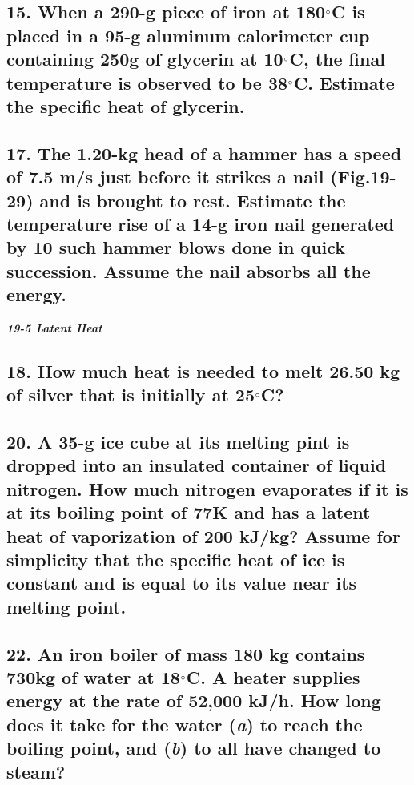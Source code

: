 \documentclass{article}
\begin{document}
\subsection*{15. When a 290-g piece of iron at 180$\degree$C is placed in a 95-g aluminum calorimeter cup containing 250g of glycerin at 10$\degree$C, the final temperature is observed to be 38$\degree$C. Estimate the specific heat of glycerin.}

\subsection*{17. The 1.20-kg head of a hammer has a speed of 7.5 m/s just before it strikes a nail (Fig.19-29) and is brought to rest. Estimate the temperature rise of a 14-g iron nail generated by 10 such hammer blows done in quick succession. Assume the nail absorbs all the energy.}
\vspace{1em}
\large{\textbf{\textit{19-5 Latent Heat}}}

\subsection*{18. How much heat is needed to melt 26.50 kg of silver that is initially at 25$\degree$C?}

\subsection*{20. A 35-g ice cube at its melting pint is dropped into an insulated container of liquid nitrogen. How much nitrogen evaporates if it is at its boiling point of 77K and has a latent heat of vaporization of 200 kJ/kg? Assume for simplicity that the specific heat of ice is constant and is equal to its value near its melting point.}

\subsection*{22. An iron boiler of mass 180 kg contains 730kg of water at 18$\degree$C. A heater supplies energy at the rate of 52,000 kJ/h. How long does it take for the water (\textit a) to reach the boiling point, and (\textit b) to all have changed to steam?}
\end{document}
